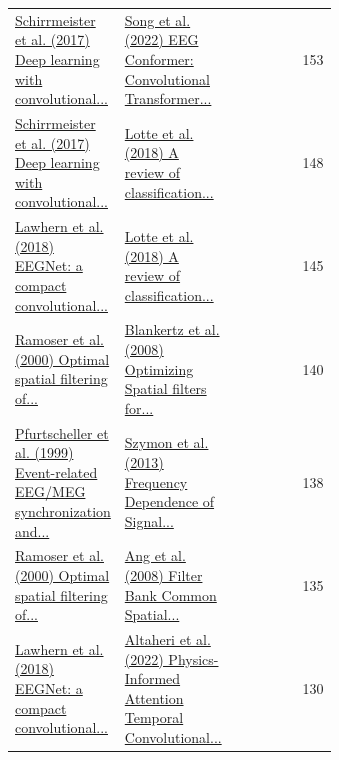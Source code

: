 \begin{table}[htbp]
\begin{tabular}{p{0.32\linewidth} p{0.32\linewidth} r}
\href{https://doi.org/10.1002/hbm.23730}{Schirrmeister et al. (2017) Deep learning with convolutional...} & \href{https://doi.org/10.1109/tnsre.2022.3230250}{Song et al. (2022) EEG Conformer: Convolutional Transformer...} & 153 \\
\href{https://doi.org/10.1002/hbm.23730}{Schirrmeister et al. (2017) Deep learning with convolutional...} & \href{https://doi.org/10.1088/1741-2552/aab2f2}{Lotte et al. (2018) A review of classification...} & 148 \\
\href{https://doi.org/10.1088/1741-2552/aace8c}{Lawhern et al. (2018) EEGNet: a compact convolutional...} & \href{https://doi.org/10.1088/1741-2552/aab2f2}{Lotte et al. (2018) A review of classification...} & 145 \\
\href{https://doi.org/10.1109/86.895946}{Ramoser et al. (2000) Optimal spatial filtering of...} & \href{https://doi.org/10.1109/msp.2008.4408441}{Blankertz et al. (2008) Optimizing Spatial filters for...} & 140 \\
\href{https://doi.org/10.1016/s1388-2457(99)00141-8}{Pfurtscheller et al. (1999) Event-related EEG/MEG synchronization and...} & \href{https://doi.org/10.18154/rwth-conv-084442}{Szymon et al. (2013) Frequency Dependence of Signal...} & 138 \\
\href{https://doi.org/10.1109/86.895946}{Ramoser et al. (2000) Optimal spatial filtering of...} & \href{https://doi.org/10.1109/ijcnn.2008.4634130}{Ang et al. (2008) Filter Bank Common Spatial...} & 135 \\
\href{https://doi.org/10.1088/1741-2552/aace8c}{Lawhern et al. (2018) EEGNet: a compact convolutional...} & \href{https://doi.org/10.1109/tii.2022.3197419}{Altaheri et al. (2022) Physics-Informed Attention Temporal Convolutional...} & 130 \\
\bottomrule
\end{tabular}
\end{table}